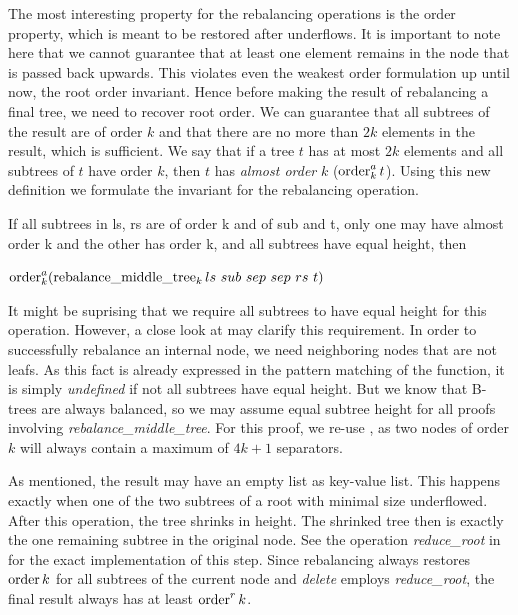 The most interesting property for the rebalancing operations is the order property,
which is meant to be restored after underflows.
It is important to note here that we cannot guarantee
that at least one element remains in the node that
is passed back upwards.
This violates even the weakest order formulation up until now,
the root order invariant.
Hence before making the result of rebalancing
a final tree, we need to recover root order.
We can guarantee that all subtrees of the result are of order $k$
and that there are no more than $2k$ elements in the result,
which is sufficient.
We say that if a tree $t$ has at most $2k$ elements
and all subtrees of $t$ have order $k$, then $t$ has
\textit{almost order} $k$ ($\operatorname{order}^a_k t$).
Using this new definition we formulate the invariant for
the rebalancing operation.

\begin{lemma}
    If all subtrees in ls, rs are of order k 
    and of sub and t, only one may have almost order k and the other has order k,
    and all subtrees have equal height, then \\
    \begin{center}
    $\order^a_k (\rebalancemt_k ls\ sub\ sep\ sep\ rs\ t)$
    \end{center}
\end{lemma}

It might be suprising that we require all subtrees to have equal height
for this operation.
However, a close look at  may clarify this requirement.
In order to successfully rebalance an internal node, we need neighboring
nodes that are not leafs.
As this fact is already expressed in the pattern matching of the function,
it is simply \textit{undefined} if not all subtrees have equal height.
But we know that B-trees are always balanced,
so we may assume equal subtree height for all proofs
involving \textit{rebalance\_middle\_tree}.
For this proof, we re-use ,
as two nodes of order $k$ will always contain
a maximum of $4k+1$ separators.

As mentioned, the result may have an empty list as key-value list.
This happens exactly when one of the two subtrees of a root
with minimal size underflowed.
After this operation, the tree shrinks in height.
The shrinked tree then is exactly the one remaining subtree in the original node.
See the operation \textit{reduce\_root} in  for the exact implementation
of this step.
Since rebalancing always restores $\operatorname{order} k$ for all subtrees
of the current node and \textit{delete} employs \textit{reduce\_root},
the final result always has at least $\operatorname{order}^r k$.


